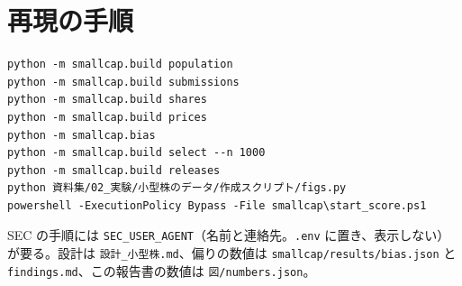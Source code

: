 \documentclass[xelatex,ja=standard,jafont=haranoaji,a4paper,10pt,openany]{bxjsreport}
\newcommand{\code}[1]{\texttt{#1}}
\begin{document}
\chapter*{再現の手順}

\begin{verbatim}
python -m smallcap.build population
python -m smallcap.build submissions
python -m smallcap.build shares
python -m smallcap.build prices
python -m smallcap.bias
python -m smallcap.build select --n 1000
python -m smallcap.build releases
python 資料集/02_実験/小型株のデータ/作成スクリプト/figs.py
powershell -ExecutionPolicy Bypass -File smallcap\start_score.ps1
\end{verbatim}

SEC の手順には \code{SEC\_USER\_AGENT}（名前と連絡先。\code{.env} に置き、表示しない）が要る。設計は \code{設計\_小型株.md}、偏りの数値は \code{smallcap/results/bias.json} と \code{findings.md}、この報告書の数値は \code{図/numbers.json}。
\end{document}
